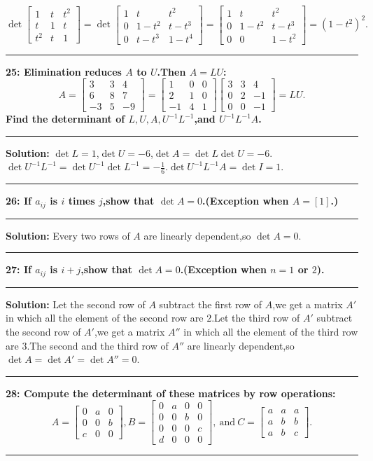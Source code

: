 \documentclass[11pt]{article}
\newcommand\question[2]{\vspace{.25in}\hrule\textbf{#1: #2}\vspace{.5em}\hrule\vspace{.10in}}
\newcommand\solution{\vspace{.10in}\textbf{Solution: }}
\begin{document}
$$
\det
\begin{bmatrix}
  1&t&t^2\\
  t&1&t\\
  t^2&t&1
\end{bmatrix}=\det
\begin{bmatrix}
  1&t&t^2\\
  0&1-t^2&t-t^3\\
  0&t-t^3&1-t^4
\end{bmatrix}=
\begin{bmatrix}
  1&t&t^2\\
  0&1-t^2&t-t^{3}\\
  0&0&1-t^2
\end{bmatrix}=(1-t^2)^2.
$$
\question{25}{Elimination reduces $A$ to $U$.Then $A=LU$:
$$
A=
\begin{bmatrix}
  3&3&4\\
  6&8&7\\
  -3&5&-9
\end{bmatrix}=
\begin{bmatrix}
  1&0&0\\
  2&1&0\\
  -1&4&1
\end{bmatrix}
\begin{bmatrix}
  3&3&4\\
  0&2&-1\\
  0&0&-1
\end{bmatrix}=LU.
$$
Find the determinant of $L,U,A,U^{-1}L^{-1}$,and $U^{-1}L^{-1}A$.
}
\solution $\det L=1$,$\det U=-6$,$\det A=\det L\det U=-6$.$\det
U^{-1}L^{-1}=\det U^{-1}\det L^{-1}=-\frac{1}{6}$.$\det
U^{-1}L^{-1}A=\det I=1$.
\question{26}{If $a_{ij}$ is $i$ times $j$,show that $\det
  A=0$.(Exception when $A=[1]$.)}
\solution Every two rows of $A$ are linearly dependent,so $\det A=0$.
\question{27}{If $a_{ij}$ is $i+j$,show that $\det A=0$.(Exception
  when $n=1$ or $2$).}
\solution Let the second row of $A$ subtract the first row of $A$,we
get a matrix $A'$ in which all the element of the second row are
$2$.Let the third row of $A'$ subtract the second row of $A'$,we get a
matrix $A''$ in which all the element of the third row are $3$.The
second and the third row of $A''$ are linearly dependent,so $\det
A=\det A'=\det A''=0$.
\question{28}{Compute the determinant of these matrices by row
  operations:
$$
A=
\begin{bmatrix}
  0&a&0\\
0&0&b\\
c&0&0
\end{bmatrix},B=
\begin{bmatrix}
  0&a&0&0\\
  0&0&b&0\\
  0&0&0&c\\
  d&0&0&0
\end{bmatrix},~\mbox{and}~C=
\begin{bmatrix}
  a&a&a\\
  a&b&b\\
  a&b&c
\end{bmatrix}.
$$
}
\end{document}
